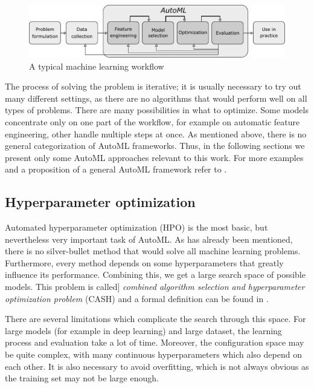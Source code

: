 \begin{figure}[ht]\centering
\includegraphics[width=\textwidth]{../img/workflow-pdfa.pdf}
\caption{A typical machine learning workflow}
\label{pic01:workflow}
\end{figure}

The process of solving the problem is iterative; it is usually necessary to try
out many different settings, as there are no algorithms that would perform
well on all types of problems.
There are many possibilities in what to optimize. Some models concentrate only
on one part of the workflow, for example on automatic feature engineering,
other handle multiple steps at once. As mentioned above, there is no general
categorization %
of AutoML frameworks. Thus, in the following sections we present only some
AutoML approaches relevant to this work. For more examples and a proposition
of a general AutoML framework refer to \cite{DBLP:journals/corr/abs-1810-13306}.

\subsection{Hyperparameter optimization}
Automated hyperparameter optimization (HPO) is the most basic, but nevertheless
very important task of AutoML. As has already been mentioned, there is no
silver-bullet method that would solve all machine learning problems.
Furthermore, every method depends on some hyperparameters that greatly
influence its performance. Combining this, we get a large search space of
possible models. This problem is called]
\emph{combined algorithm selection and hyperparameter optimization problem}
(CASH) and a formal definition can be found in
\citep{DBLP:journals/corr/abs-1208-3719}.

There are several limitations which complicate the search through this space.
For large models (for example in deep learning) and large dataset, the
learning process and evaluation take a lot of time. Moreover, the
configuration space may be quite complex, with many continuous hyperparameters
which also depend on each other. It is also necessary to avoid overfitting,
which is not always obvious as the training set may not be large enough.

